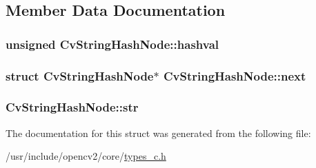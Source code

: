 \subsection{Member Data Documentation}
\hypertarget{structCvStringHashNode_a42eee0cb707f85886ea2efdf8dab63e5}{
\subsubsection[{hashval}]{\setlength{\rightskip}{0pt plus 5cm}unsigned Cv\-String\-Hash\-Node\-::hashval}}\label{structCvStringHashNode_a42eee0cb707f85886ea2efdf8dab63e5}
\hypertarget{structCvStringHashNode_a32cae37b1553f1d8cd9f40b894c368ac}{
\subsubsection[{next}]{\setlength{\rightskip}{0pt plus 5cm}struct {\bf Cv\-String\-Hash\-Node}$\ast$ Cv\-String\-Hash\-Node\-::next}}\label{structCvStringHashNode_a32cae37b1553f1d8cd9f40b894c368ac}
\hypertarget{structCvStringHashNode_ac33a4cfdba891984b035c1c577525e6d}{
\subsubsection[{str}]{ Cv\-String\-Hash\-Node\-::str}}\label{structCvStringHashNode_ac33a4cfdba891984b035c1c577525e6d}


The documentation for this struct was generated from the following file\-:\begin{DoxyCompactItemize}
\item 
/usr/include/opencv2/core/\hyperlink{core_2types__c_8h}{types\-\_\-c.\-h}\end{DoxyCompactItemize}
